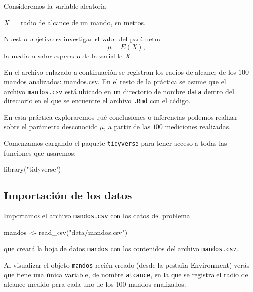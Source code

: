 \documentclass[
  degree=mecinf,
  title=normal,
  toc=normal,
  bib=normal]{mnye}
\newenvironment{Shaded}{\begin{snugshade}}{\end{snugshade}}
\newcommand{\FunctionTok}[1]{\textcolor[rgb]{0.00,0.00,0.00}{#1}}
\newcommand{\NormalTok}[1]{#1}
\newcommand{\OtherTok}[1]{\textcolor[rgb]{0.56,0.35,0.01}{#1}}
\newcommand{\StringTok}[1]{\textcolor[rgb]{0.31,0.60,0.02}{#1}}
\begin{document}
Consideremos la variable aleatoria

\begin{center}
\(X =\) radio de alcance de un mando, en metros.

\end{center}

Nuestro objetivo es investigar el valor del parámetro
\[
\mu = E(X),
\]
la media o valor esperado de la variable \(X\).

En el archivo enlazado a continuación se registran los radios de alcance de los \(100\) mandos analizados: \href{https://drive.google.com//uc?export=download\&id=1RGAPpTJJnTpj9R4jpZ5TO3u1t1RUgkJK}{mandos.csv}. En el resto de la práctica se asume que el archivo \texttt{mandos.csv} está ubicado en un directorio de nombre \texttt{data} dentro del directorio en el que se encuentre el archivo \texttt{.Rmd} con el código.

En esta práctica exploraremos qué conclusiones o inferencias podemos realizar sobre el parámetro desconocido \(\mu\), a partir de las \(100\) mediciones realizadas.

Comenzamos cargando el paquete \texttt{tidyverse} para tener acceso a todas las funciones que usaremos:

\begin{Shaded}
\begin{Highlighting}[]
\FunctionTok{library}\NormalTok{(}\StringTok{"tidyverse"}\NormalTok{)}
\end{Highlighting}
\end{Shaded}

\hypertarget{importaciuxf3n-de-los-datos}{%
\subsection{Importación de los datos}\label{importaciuxf3n-de-los-datos}}

Importamos el archivo \texttt{mandos.csv} con los datos del problema

\begin{Shaded}
\begin{Highlighting}[]
\NormalTok{mandos }\OtherTok{\textless{}{-}} \FunctionTok{read\_csv}\NormalTok{(}\StringTok{"data/mandos.csv"}\NormalTok{)}
\end{Highlighting}
\end{Shaded}

que creará la hoja de datos \texttt{mandos} con los contenidos del archivo \texttt{mandos.csv}.

Al visualizar el objeto \texttt{mandos} recién creado (desde la pestaña Environment) verás que tiene una única variable, de nombre \texttt{alcance}, en la que se registra el radio de alcance medido para cada uno de los \(100\) mandos analizados.
\end{document}
